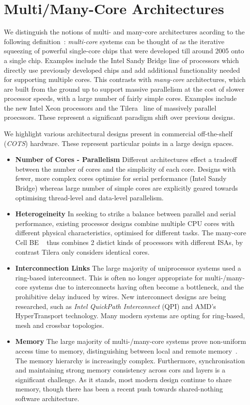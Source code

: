 \section{Multi/Many-Core Architectures}
\label{sec:overview}
We distinguish the notions of multi- and many-core
architectures acording to the following definition~\cite{Re:12}:
\emph{multi-core} systems can be thought of as the iterative squeezing of powerful
 single-core chips that
were developed till around 2005 onto a single chip. Examples include the
 Intel Sandy Bridge line of processors which directly use previously developed chips
and add additional functionality needed for supporting multiple cores. This
contrasts with \emph{many-core} architectures, which are built from the ground up 
to support massive parallelism at the cost of slower processor speeds,
with a large number of fairly simple cores.  Examples include
the new Intel Xeon processors and the Tilera~\cite{bell2008tile64} line of massively parallel proecssors.
These represent a significant paradigm shift over previous designs.

We highlight various architectural designs present in commercial off-the-shelf
(\emph{COTS}) hardware. These represent particular points in a large design
spaces.
\begin{itemize}
\item {\bf Number of Cores - Parallelism} Different architectures effect a tradeoff between the
number of cores and the simplicity of each core. Designs with fewer,
more complex cores optimise for serial performance (Intel Sandy Bridge)
whereas large number of simple cores are explicitly geared towards
optimising thread-level and data-level parallelism.
\item {\bf Heterogeineity} In seeking to strike a balance between parallel and
serial performance, existing processor designs combine multiple CPU cores with
different physical characteristics, optimised for different tasks. The many-core Cell BE ~\cite{Cell} thus combines 2 distict kinds of processors with different ISAs, by
contrast Tilera only considers identical cores.
\item {\bf Interconnection Links} The large majority of uniprocessor systems
used a ring-based interconnect. This is often no longer appropriate for
multi-/many-core systems due to interconnects having often become a bottleneck,
and the prohibitive delay induced by wires. New interconnect designs are being researched,
such as \emph{Intel QuickPath Interconnect} (QPI) and  AMD's HyperTransport technology.
Many modern systems are opting for ring-based, mesh and crossbar topologies.
\item {\bf Memory} The large majority of multi-/many-core systems prove
non-uniform access time to memory, distinguishing between local and remote
memory~\cite{MZGT11}. The memory hierarchy is increasingly complex.
Furthermore, synchronisation and maintaining strong memory consistency across
cors and layers is a significant challenge. As it stands, most modern
design continue to share memory, though there has been a recent push
towards shared-nothing software architecture.
\end{itemize}
